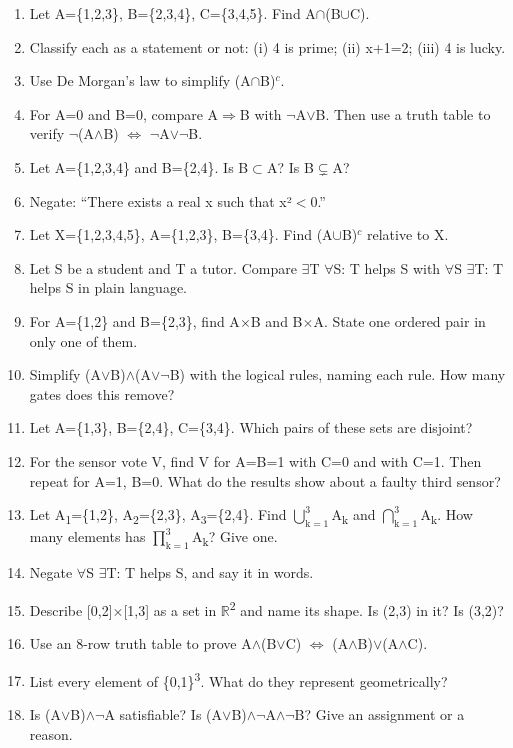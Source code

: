 \documentclass[11pt]{article}
\begin{document}
\begin{keepsection}
\begin{enumerate}
\item Let A=\{1,2,3\}, B=\{2,3,4\}, C=\{3,4,5\}. Find A\ensuremath{\cap}(B\ensuremath{\cup}C).
\item Classify each as a statement or not: (i) 4 is prime; (ii) x+1=2; (iii) 4 is lucky.
\item Use De Morgan’s law to simplify (A\ensuremath{\cap}B)\ensuremath{^{c}}.
\item For A=0 and B=0, compare A\ensuremath{\Rightarrow}B with \ensuremath{\neg}A\ensuremath{\lor}B. Then use a truth table to verify \ensuremath{\neg}(A\ensuremath{\land}B) \ensuremath{\Leftrightarrow} \ensuremath{\neg}A\ensuremath{\lor}\ensuremath{\neg}B.
\item Let A=\{1,2,3,4\} and B=\{2,4\}. Is B\ensuremath{\subset}A? Is B\ensuremath{\subsetneq}A?
\item Negate: “There exists a real x such that x²\ensuremath{<}0.”
\item Let X=\{1,2,3,4,5\}, A=\{1,2,3\}, B=\{3,4\}. Find (A\ensuremath{\cup}B)\ensuremath{^{c}} relative to X.
\item Let S be a student and T a tutor. Compare \ensuremath{\exists}T \ensuremath{\forall}S: T helps S with \ensuremath{\forall}S \ensuremath{\exists}T: T helps S in plain language.
\item For A=\{1,2\} and B=\{2,3\}, find A\ensuremath{\times}B and B\ensuremath{\times}A. State one ordered pair in only one of them.
\item Simplify (A\ensuremath{\lor}B)\ensuremath{\land}(A\ensuremath{\lor}\ensuremath{\neg}B) with the logical rules, naming each rule. How many gates does this remove?
\item Let A=\{1,3\}, B=\{2,4\}, C=\{3,4\}. Which pairs of these sets are disjoint?
\item For the sensor vote V, find V for A=B=1 with C=0 and with C=1. Then repeat for A=1, B=0. What do the results show about a faulty third sensor?
\item Let A\textsubscript{1}=\{1,2\}, A\textsubscript{2}=\{2,3\}, A\textsubscript{3}=\{2,4\}. Find $\bigcup_{\mathrm{k}=1}^{3} $A\textsubscript{k} and $\bigcap_{\mathrm{k}=1}^{3} $A\textsubscript{k}. How many elements has $\prod_{\mathrm{k}=1}^{3} $A\textsubscript{k}? Give one.
\item Negate \ensuremath{\forall}S \ensuremath{\exists}T: T helps S, and say it in words.
\item Describe [0,2]\ensuremath{\times}[1,3] as a set in \ensuremath{\mathbb{R}}\textsuperscript{2} and name its shape. Is (2,3) in it? Is (3,2)?
\item Use an 8-row truth table to prove A\ensuremath{\land}(B\ensuremath{\lor}C) \ensuremath{\Leftrightarrow} (A\ensuremath{\land}B)\ensuremath{\lor}(A\ensuremath{\land}C).
\item List every element of \{0,1\}\textsuperscript{3}. What do they represent geometrically?
\item Is (A\ensuremath{\lor}B)\ensuremath{\land}\ensuremath{\neg}A satisfiable? Is (A\ensuremath{\lor}B)\ensuremath{\land}\ensuremath{\neg}A\ensuremath{\land}\ensuremath{\neg}B? Give an assignment or a reason.
\end{enumerate}


\end{keepsection}
\end{document}
